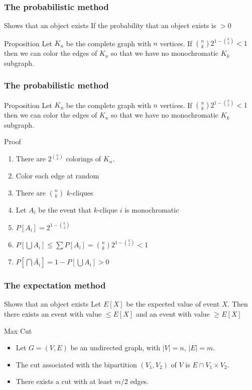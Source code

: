 \documentclass[12pt,aspectratio=169]{beamer}
\begin{document}
\begin{frame}[fragile]
\frametitle{The probabilistic method}
\begin{block}{Shows that an object exists}
  If the probability that an object exists is $>0$
\end{block}

\begin{block}{Proposition}
  Let $K_{n}$ be the complete graph with $n$ vertices.
%
If ${n \choose k} 2^{1- {k \choose 2}} <1$ then we can color the edges of $K_{n}$ so that we
have no monochromatic $K_{k}$ subgraph.
%
\end{block}
\end{frame}

\begin{frame}[fragile]
\frametitle{The probabilistic method}
\begin{block}{Proposition}
  Let $K_{n}$ be the complete graph with $n$ vertices.
%
If ${n \choose k} 2^{1- {k \choose 2}} <1$ then we can color the edges of $K_{n}$ so that we
have no monochromatic $K_{k}$ subgraph.
%
\end{block}

\begin{block}{Proof}
  \begin{enumerate}
  \item
    There are $2^{n \choose 2}$ colorings of $K_{n}$.
\item
  Color each edge at random
  \item There are $n \choose k$ $k$-cliques
  \item
    Let $A_{i}$ be the event that $k$-clique $i$ is monochromatic
  \item
    $P[A_{i}] = 2^{1- {k \choose 2}}$
  \item
    $P[\bigcup A_{i}] \le \sum P[A_{i}] = {n \choose k} 2^{1- {k \choose 2}} < 1$
  \item
    $P[\bigcap \bar{A_{i}}] = 1 - P[\bigcup A_{i}] > 0$
  \end{enumerate}
\end{block}
\end{frame}

\begin{frame}[fragile]
\frametitle{The expectation method}
\begin{block}{Shows that an object exists}
  Let $E[X]$ be the expected value of event $X$.
  Then there exists an event with value $\le E[X]$ and an event with value $\ge E[X]$
\end{block}
\begin{block}{Max Cut}
  \begin{itemize}
    \item
  Let $G=(V,E)$ be an undirected graph, with $|V|=n$, $|E|=m$.
%
    \item
  The \alert{cut} associated with the bipartition $(V_{1},V_{2})$ of $V$ is $E\cap
  V_{1}\times V_{2}$.
%
    \item
  There exists a cut with at least $m/2$ edges.
%
\end{itemize}
\end{block}
\end{frame}
\end{document}
